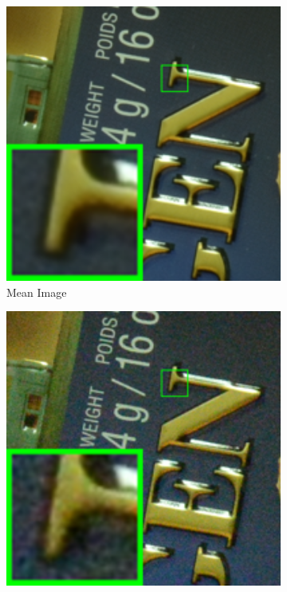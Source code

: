 \begin{figure}
    \centering
    \begin{subfigure}[t]{0.19\textwidth}
        \centering
        \includegraphics[width=1\textwidth]{images/twsc/cc/resize_br_Mean_d800_iso6400_1_real.png}
		\caption{Mean Image}
    \end{subfigure}
    \hfill
    \begin{subfigure}[t]{0.19\textwidth}
        \centering
        \includegraphics[width=1\textwidth]{images/twsc/cc/resize_br_Noisy_d800_iso6400_1_real.png}

\end{subfigure}
\end{figure}
